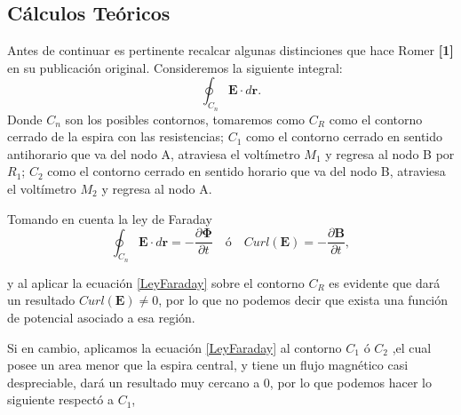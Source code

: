 \documentclass[a0,portrait]{a0poster}
\begin{document}
\begin{multicols}{2}

\color{Black} %

\section*{Cálculos Teóricos}





\noindent Antes de continuar es pertinente recalcar algunas distinciones que hace Romer \textbf{[{1}]} en su publicación original.
Consideremos la siguiente integral:
\begin{equation}
    \oint_{C_n} \mathbf{E} \cdot d\mathbf{r}.
\end{equation}
Donde $C_n$ son los posibles contornos, tomaremos como $C_R$  como el contorno cerrado de la espira con las resistencias; $C_1$  como el contorno cerrado en sentido antihorario que va del nodo A, atraviesa el voltímetro $M_1$ y regresa al nodo B por $R_1$; $C_2$  como el contorno cerrado en sentido horario que va del nodo B, atraviesa el voltímetro $M_2$ y regresa al nodo A.



\noindent Tomando en cuenta la ley de Faraday 
\begin{equation}
    \oint_{C_n}  \mathbf{E} \cdot d\mathbf{r}=-\frac{\partial \boldsymbol{\Phi} }{\partial t} \quad \text{ó}\quad Curl(\mathbf{E}) =-\frac{\partial \mathbf{B}}{\partial t},
    \label{LeyFaraday}
\end{equation}

\noindent y al aplicar la ecuación \ref{LeyFaraday} sobre el contorno $C_R$ es evidente que dará un resultado $Curl(\mathbf{E}) \neq 0 $, por lo que no podemos decir que exista una función de potencial asociado a esa región.

Si en cambio, aplicamos la ecuación \ref{LeyFaraday} al contorno $C_1$ ó  $C_2$ ,el cual posee un area menor que la espira central, y tiene un flujo magnético casi despreciable, dará un resultado muy cercano a 0, por lo que podemos hacer lo siguiente respectó a $C_1$,  


\end{multicols}
\end{document}
